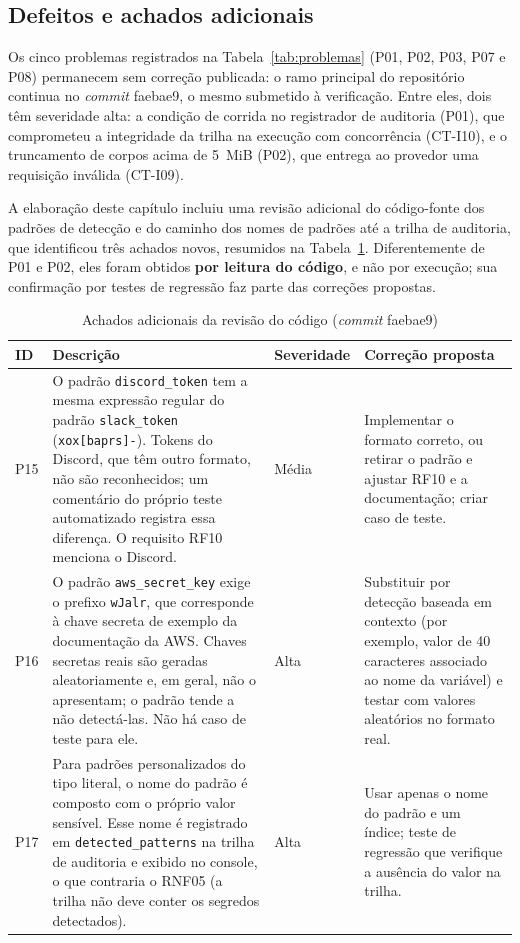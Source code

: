 \subsection{Defeitos e achados adicionais}
\label{sec:res_achados}

Os cinco problemas registrados na Tabela~\ref{tab:problemas} (P01, P02, P03, P07 e P08) permanecem sem correção publicada: o ramo principal do repositório continua no \textit{commit} faebae9, o mesmo submetido à verificação. Entre eles, dois têm severidade alta: a condição de corrida no registrador de auditoria (P01), que comprometeu a integridade da trilha na execução com concorrência (CT-I10), e o truncamento de corpos acima de 5~MiB (P02), que entrega ao provedor uma requisição inválida (CT-I09).

A elaboração deste capítulo incluiu uma revisão adicional do código-fonte dos padrões de detecção e do caminho dos nomes de padrões até a trilha de auditoria, que identificou três achados novos, resumidos na Tabela~\ref{tab:achados}. Diferentemente de P01 e P02, eles foram obtidos \textbf{por leitura do código}, e não por execução; sua confirmação por testes de regressão faz parte das correções propostas.

\begin{table}[htb]
\centering
\caption{Achados adicionais da revisão do código (\textit{commit} faebae9)}\label{tab:achados}
\small
\begin{tabular}{|p{1.0cm}|p{7.0cm}|p{1.6cm}|p{4.6cm}|}
\hline
\textbf{ID} & \textbf{Descrição} & \textbf{Severidade} & \textbf{Correção proposta} \\ \hline
P15 & O padrão \texttt{discord\_token} tem a mesma expressão regular do padrão \texttt{slack\_token} (\texttt{xox[baprs]-}). Tokens do Discord, que têm outro formato, não são reconhecidos; um comentário do próprio teste automatizado registra essa diferença. O requisito RF10 menciona o Discord. & Média & Implementar o formato correto, ou retirar o padrão e ajustar RF10 e a documentação; criar caso de teste. \\ \hline
P16 & O padrão \texttt{aws\_secret\_key} exige o prefixo \texttt{wJalr}, que corresponde à chave secreta de exemplo da documentação da AWS. Chaves secretas reais são geradas aleatoriamente e, em geral, não o apresentam; o padrão tende a não detectá-las. Não há caso de teste para ele. & Alta & Substituir por detecção baseada em contexto (por exemplo, valor de 40 caracteres associado ao nome da variável) e testar com valores aleatórios no formato real. \\ \hline
P17 & Para padrões personalizados do tipo literal, o nome do padrão é composto com o próprio valor sensível. Esse nome é registrado em \texttt{detected\_patterns} na trilha de auditoria e exibido no console, o que contraria o RNF05 (a trilha não deve conter os segredos detectados). & Alta & Usar apenas o nome do padrão e um índice; teste de regressão que verifique a ausência do valor na trilha. \\ \hline
\end{tabular}
\end{table}

